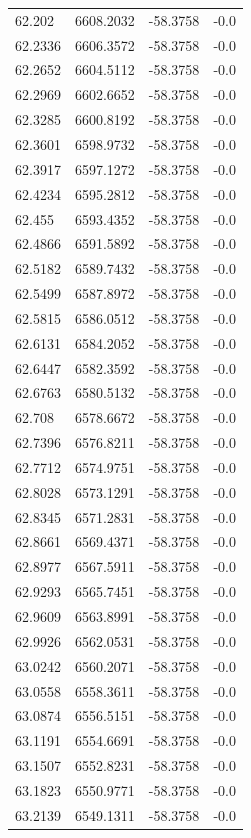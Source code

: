 \begin{table}[H]
\begin{tabular}{llll}
62.202 & 6608.2032 & -58.3758 & -0.0 \\
62.2336 & 6606.3572 & -58.3758 & -0.0 \\
62.2652 & 6604.5112 & -58.3758 & -0.0 \\
62.2969 & 6602.6652 & -58.3758 & -0.0 \\
62.3285 & 6600.8192 & -58.3758 & -0.0 \\
62.3601 & 6598.9732 & -58.3758 & -0.0 \\
62.3917 & 6597.1272 & -58.3758 & -0.0 \\
62.4234 & 6595.2812 & -58.3758 & -0.0 \\
62.455 & 6593.4352 & -58.3758 & -0.0 \\
62.4866 & 6591.5892 & -58.3758 & -0.0 \\
62.5182 & 6589.7432 & -58.3758 & -0.0 \\
62.5499 & 6587.8972 & -58.3758 & -0.0 \\
62.5815 & 6586.0512 & -58.3758 & -0.0 \\
62.6131 & 6584.2052 & -58.3758 & -0.0 \\
62.6447 & 6582.3592 & -58.3758 & -0.0 \\
62.6763 & 6580.5132 & -58.3758 & -0.0 \\
62.708 & 6578.6672 & -58.3758 & -0.0 \\
62.7396 & 6576.8211 & -58.3758 & -0.0 \\
62.7712 & 6574.9751 & -58.3758 & -0.0 \\
62.8028 & 6573.1291 & -58.3758 & -0.0 \\
62.8345 & 6571.2831 & -58.3758 & -0.0 \\
62.8661 & 6569.4371 & -58.3758 & -0.0 \\
62.8977 & 6567.5911 & -58.3758 & -0.0 \\
62.9293 & 6565.7451 & -58.3758 & -0.0 \\
62.9609 & 6563.8991 & -58.3758 & -0.0 \\
62.9926 & 6562.0531 & -58.3758 & -0.0 \\
63.0242 & 6560.2071 & -58.3758 & -0.0 \\
63.0558 & 6558.3611 & -58.3758 & -0.0 \\
63.0874 & 6556.5151 & -58.3758 & -0.0 \\
63.1191 & 6554.6691 & -58.3758 & -0.0 \\
63.1507 & 6552.8231 & -58.3758 & -0.0 \\
63.1823 & 6550.9771 & -58.3758 & -0.0 \\
63.2139 & 6549.1311 & -58.3758 & -0.0 \\

\end{tabular}
\end{table}

